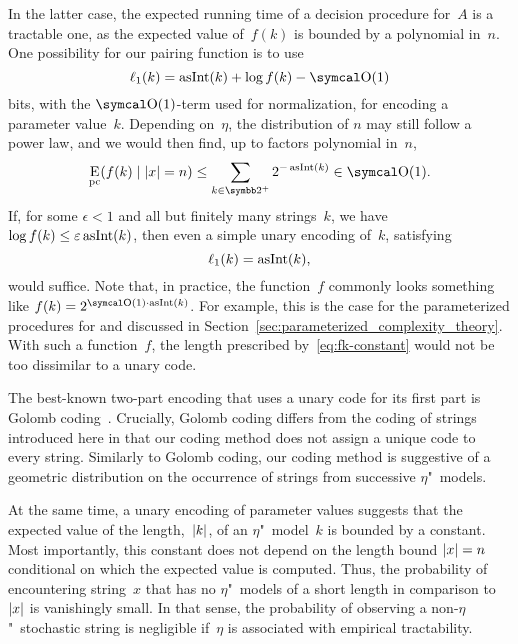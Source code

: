 In the latter case, the expected running time of a decision procedure for~$A$ is a tractable one, as the expected value of~$f(k)$ is bounded by a polynomial in~$n$.
One possibility for our pairing function is to use
\begin{equation}
\label{eq:fk-constant}
  \ell_1(k) = \asNat(k) + \log f(k) - \bigO(1)
\end{equation}
bits, with the $\bigO(1)$-term used for normalization, for encoding a parameter value~$k$.
Depending on~$\eta$, the distribution of $n$ may still follow a power law, and we would then find, up to factors polynomial in~$n$,
\begin{equation*}
  \Ex_\mathrm{pc}(f(k) \given \length{x} = n) \le \sum_{k \in \binary^+} 2^{-\asNat(k)} \in \bigO(1).
\end{equation*}
If, for some $\epsilon < 1$ and all but finitely many strings~$k$, we have $\log f(k) \le \varepsilon \operatorname{asInt}(k)$, then even a simple unary encoding of~$k$, satisfying
\begin{equation*}
  \ell_1(k) = \operatorname{asInt}(k),
\end{equation*}
would suffice.
Note that, in practice, the function~$f$ commonly looks something like $f(k) = 2^{\bigO(1) \cdot \asNat(k)}$.
For example, this is the case for the parameterized procedures for  and  discussed in Section~\ref{sec:parameterized_complexity_theory}.
With such a function~$f$, the length prescribed by~\eqref{eq:fk-constant} would not be too dissimilar to a unary code.

The best-known two-part encoding that uses a unary code for its first part is Golomb coding~\parencite{golomb1966run-length,sayood2017introduction}.
Crucially, Golomb coding differs from the coding of strings introduced here in that our coding method does not assign a unique code to every string.
Similarly to Golomb coding, our coding method is suggestive of a geometric distribution on the occurrence of strings from successive $\eta$"~models.

At the same time, a unary encoding of parameter values suggests that the expected value of the length,~${\lvert k\rvert}$, of an $\eta$"~model~$k$ is bounded by a constant.
Most importantly, this constant does not depend on the length bound ${\lvert x\rvert} = n$ conditional on which the expected value is computed.
Thus, the probability of encountering string~$x$ that has no $\eta$"~models of a short length in comparison to~${\lvert x\rvert}$ is vanishingly small.
In that sense, the probability of observing a non-$\eta$"~stochastic string is negligible if~$\eta$ is associated with empirical tractability.
\slogan[\label{slo:expected}]{The expected parameter value is small.}

